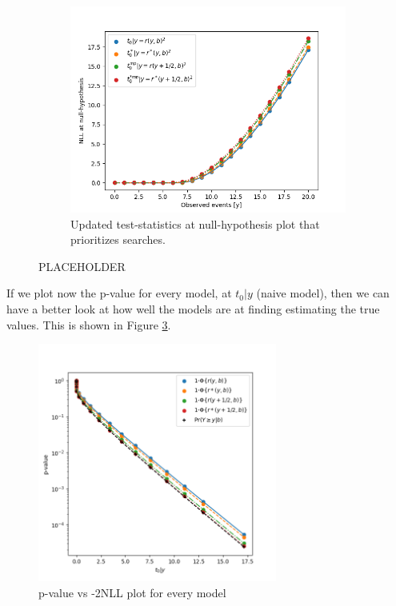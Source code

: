 \documentclass[14pt, a4paper]{article}  %
\begin{document}
\begin{figure}[!ht]
\begin{subfigure}[b]{0.49\textwidth}
        \includegraphics[width=1\textwidth]{Poisson_approx/NLL_null.png}\caption{Updated test-statistics at null-hypothesis plot that prioritizes searches. }\label{fig:example_nll0_fr}
     \end{subfigure}
	\caption{PLACEHOLDER}
 \end{figure}
 If we plot now the p-value for every model, at $t_0|y$ (naive model), then we can have a better look at how well the models are at finding estimating the true values. This is shown in Figure \ref{fig:example_p0}.
\begin{figure}[!ht]
	\centering
        \includegraphics[width=0.7\textwidth]{Poisson_approx/p_values_vs_nom_2NLL.png}\caption{p-value vs -2NLL plot for every model}\label{fig:example_p0}
\end{figure} 
\end{document}
